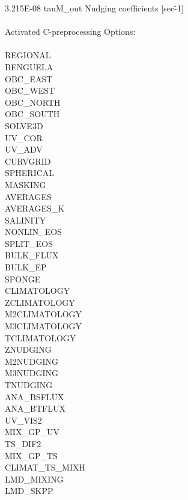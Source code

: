  3.215E-08  tauM\_out Nudging coefficients [sec\^-1]\\
\\
 Activated C-preprocessing Options:\\
\\
          REGIONAL\\
          BENGUELA\\
          OBC\_EAST\\
          OBC\_WEST\\
          OBC\_NORTH\\
          OBC\_SOUTH\\
          SOLVE3D\\
          UV\_COR\\
          UV\_ADV\\
          CURVGRID\\
          SPHERICAL\\
          MASKING\\
          AVERAGES\\
          AVERAGES\_K\\
          SALINITY\\
          NONLIN\_EOS\\
          SPLIT\_EOS\\
          BULK\_FLUX\\
          BULK\_EP\\
          SPONGE\\
          CLIMATOLOGY\\
          ZCLIMATOLOGY\\
          M2CLIMATOLOGY\\
          M3CLIMATOLOGY\\
          TCLIMATOLOGY\\
          ZNUDGING\\
          M2NUDGING\\
          M3NUDGING\\
          TNUDGING\\
          ANA\_BSFLUX\\
          ANA\_BTFLUX\\
          UV\_VIS2\\
          MIX\_GP\_UV\\
          TS\_DIF2\\
          MIX\_GP\_TS\\
          CLIMAT\_TS\_MIXH\\
          LMD\_MIXING\\
          LMD\_SKPP\\
